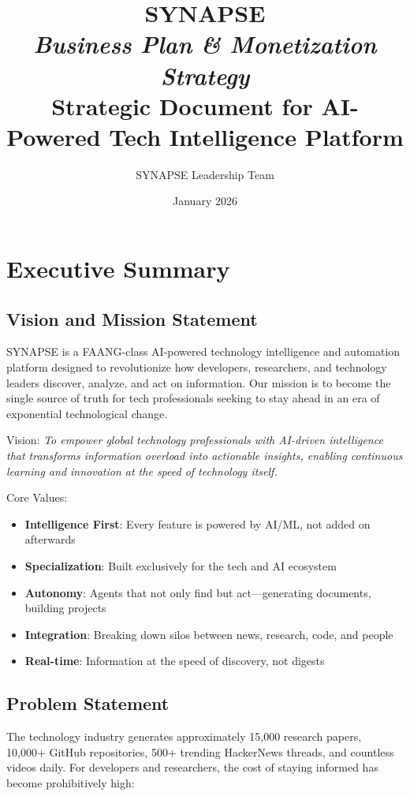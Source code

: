 \documentclass{report}
\title{\huge\textbf{SYNAPSE}\\[0.5cm]\Large\textit{Business Plan \& Monetization Strategy}\\[0.3cm]\normalsize Strategic Document for AI-Powered Tech Intelligence Platform}
\author{SYNAPSE Leadership Team}
\date{January 2026}
\begin{document}
\maketitle

\newpage

\tableofcontents

\newpage

\chapter{Executive Summary}

\section{Vision and Mission Statement}

SYNAPSE is a FAANG-class AI-powered technology intelligence and automation platform designed to revolutionize how developers, researchers, and technology leaders discover, analyze, and act on information. Our mission is to become the single source of truth for tech professionals seeking to stay ahead in an era of exponential technological change.

Vision: \textit{To empower global technology professionals with AI-driven intelligence that transforms information overload into actionable insights, enabling continuous learning and innovation at the speed of technology itself.}

Core Values:
\begin{itemize}
    \item \textbf{Intelligence First}: Every feature is powered by AI/ML, not added on afterwards
    \item \textbf{Specialization}: Built exclusively for the tech and AI ecosystem
    \item \textbf{Autonomy}: Agents that not only find but act---generating documents, building projects
    \item \textbf{Integration}: Breaking down silos between news, research, code, and people
    \item \textbf{Real-time}: Information at the speed of discovery, not digests
\end{itemize}

\section{Problem Statement}

The technology industry generates approximately 15,000 research papers, 10,000+ GitHub repositories, 500+ trending HackerNews threads, and countless videos daily. For developers and researchers, the cost of staying informed has become prohibitively high:
\end{document}

